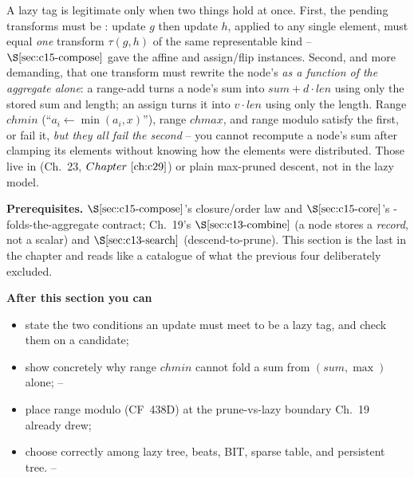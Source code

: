 \begin{topicintro}
A lazy tag is legitimate only when two things hold at once.  First, the pending transforms must be : update \(g\) then update \(h\), applied to any single element, must equal \emph{one} transform \(\tau(g,h)\) of the same representable kind -- \(\secref{c15-compose}\) gave the affine and assign/flip instances.  Second, and more demanding, that one transform must rewrite the node's  \emph{as a function of the aggregate alone}: a range-add turns a node's sum into \(\mathit{sum}+d\cdot\mathit{len}\) using only the stored sum and length; an assign turns it into \(v\cdot\mathit{len}\) using only the length.  Range \(\mathit{chmin}\) (``\(a_i\leftarrow\min(a_i,x)\)''), range \(\mathit{chmax}\), and range modulo satisfy the first, or fail it, \emph{but they all fail the second} -- you cannot recompute a node's sum after clamping its elements without knowing how the elements were distributed.  Those live in  (Ch.~23, \(\chref{c29}\)) or plain max-pruned descent, not in the lazy model.

\textbf{Prerequisites.} \(\secref{c15-compose}\)'s closure/order law and \(\secref{c15-core}\)'s -folds-the-aggregate contract; Ch.~19's \(\secref{c13-combine}\) (a node stores a \emph{record}, not a scalar) and \(\secref{c13-search}\) (descend-to-prune).  This section is the last in the chapter and reads like a catalogue of what the previous four deliberately excluded.

\textbf{After this section you can}
\begin{itemize}[nosep]
  \item state the two conditions an update must meet to be a lazy tag, and check them on a candidate; \hfill{}
  \item show concretely why range \(\mathit{chmin}\) cannot fold a sum from \((\mathit{sum},\max)\) alone; \hfill{}--
  \item place range modulo (CF~438D) at the prune-vs-lazy boundary Ch.~19 already drew; \hfill{}
  \item choose correctly among lazy tree, beats, BIT, sparse table, and persistent tree. \hfill{}--
\end{itemize}
\end{topicintro}

